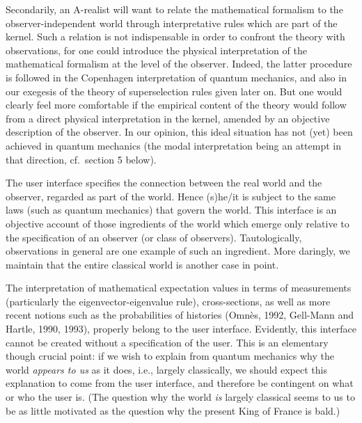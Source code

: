 Secondarily, an A-realist will want to relate the mathematical formalism to the
observer-independent
world through interpretative rules which are part of the kernel. Such a
relation is  not
indispensable in order to confront the theory with observations, for one could
introduce the physical
interpretation of the mathematical formalism  at the level of the observer.
Indeed, the latter procedure is followed in the Copenhagen interpretation of
quantum mechanics, and
also in our exegesis of the theory of superselection rules given later on.
 But one would  clearly feel more comfortable if the empirical
content of the theory would follow from  a direct physical interpretation in
the kernel, amended by an
objective description of the observer. In our opinion, this ideal situation has
not (yet) been
achieved in quantum mechanics (the modal interpretation being an attempt in
that direction, cf.\
section 5 below).

The user interface specifies the connection between the real world and the
observer, regarded
as part of the world. Hence  (s)he/it is subject to the same laws (such as
quantum mechanics)
that govern the world. This interface is an objective account of those
ingredients of the world
which emerge only relative to the specification of an observer (or class of
observers).
Tautologically, observations in general are one example of such an ingredient.
More daringly,
we maintain that the entire classical world is another case in point.

The interpretation of mathematical expectation values in terms of measurements
(particularly the
eigenvector-eigenvalue rule), cross-sections, as well as more recent notions
such as the
probabilities of histories (Omn\`{e}s, 1992, Gell-Mann and Hartle, 1990, 1993),
properly belong to the
user interface. Evidently,  this interface cannot be created without a
specification of the user.
This is an elementary though crucial point: if we wish to explain from quantum
mechanics why the
world {\em appears to us} as it does, i.e., largely  classically, we should
expect this explanation
to come from the user interface, and therefore be contingent on what or who the
user is. (The
question why the world {\em is} largely classical seems to us to be as little
motivated as the
question why the present King of France is bald.)

